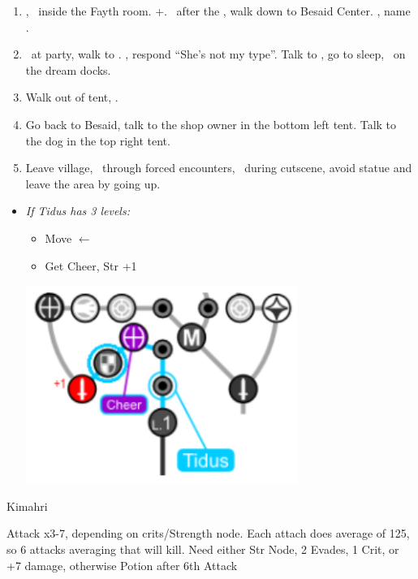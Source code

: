 \begin{enumerate}[resume]
  \item \cs[1:00], \sd\ inside the Fayth room. \fmv+\cs[1:00]. \sd\ after the \fmv, walk down to Besaid Center. \cs[1:40], name \valefor.
  \item \sd\ at party, walk to \yuna. \sd, respond ``She's not my type''. Talk to \wakka, go to sleep, \sd\ on the dream docks.
  \item Walk out of tent, \sd.
  \item Go back to Besaid, talk to the shop owner in the bottom left tent. Talk to the dog in the top right tent.
  \item Leave village, \sd\ through forced encounters, \sd\ during cutscene, avoid statue and leave the area by going up.
\end{enumerate}
\begin{spheregrid}
  \begin{itemize}
    \item \textit{If Tidus has 3 levels:}
          \begin{itemize}
            \item Move $\leftarrow$
            \item Get Cheer, Str +1
          \end{itemize}
          \includegraphics{graphics/tiduscheer}
  \end{itemize}
\end{spheregrid}
\begin{battle}[750]{Kimahri}
  \begin{itemize}
    \tidusf Attack x3-7, depending on crits/Strength node.
    \tidusf Each attach does average of 125, so 6 attacks averaging that will kill.
    \tidusf Need either Str Node, 2 Evades, 1 Crit, or +7 damage, otherwise Potion after 6th Attack
  \end{itemize}
\end{battle}
